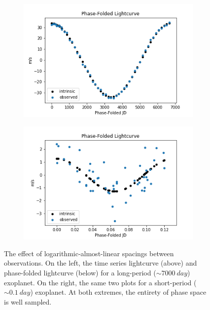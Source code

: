 \documentclass[12pt,manuscript]{aastex}
\begin{document}
\begin{figure}
  
  \begin{subfigure}[b]{.45\linewidth}
  \includegraphics[width=\linewidth]{../figures/long_P_folded}
  \end{subfigure}
  \begin{subfigure}[b]{.45\linewidth}
  \includegraphics[width=\linewidth]{../figures/short_P_folded}
  \end{subfigure}

  \caption{The effect of logarithmic-almost-linear spacings between observations. On the left, the time series lightcurve (above) and phase-folded lightcurve (below) for a long-period ($\sim \SI{7000}{day}$) exoplanet. On the right, the same two plots for a short-period ($\sim \SI{0.1}{day}$) exoplanet. At both extremes, the entirety of phase space is well sampled.}
  \label{fig: periods}
\end{figure}
\end{document}
